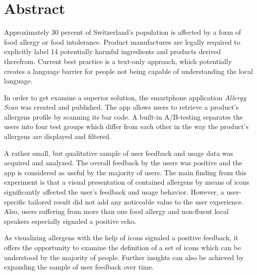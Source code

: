\chapter*{Abstract}

Approximately 30 percent of Switzerland’s population is affected by a form of food allergy or food intolerance. Product manufactures are legally required to explicitly label 14 potentially harmful ingredients and products derived therefrom. Current best practice is a text-only approach, which potentially creates a language barrier for people not being capable of understanding the local language.


In order to get examine a superior solution, the smartphone application \emph{Allergy Scan} was created and published. The app allows users to retrieve a product’s allergens profile by scanning its bar code. A built-in A/B-testing separates the users into four test groups which differ from each other in the way the product’s allergens are displayed and filtered.


A rather small, but qualitative sample of user feedback and usage data was acquired and analyzed. The overall feedback by the users was positive and the app is considered as useful by the majority of users. The main finding from this experiment is that a visual presentation of contained allergens by means of icons significantly affected the user’s feedback and usage behavior. However, a user-specific tailored result did not add any noticeable value to the user experience. Also, users suffering from more than one food allergy and non-fluent local speakers especially signaled a positive echo.


As visualizing allergens with the help of icons signaled a positive feedback, it offers the opportunity to examine the definition of a set of icons which can be understood by the majority of people. Further insights can also be achieved by expanding the sample of user feedback over time.
